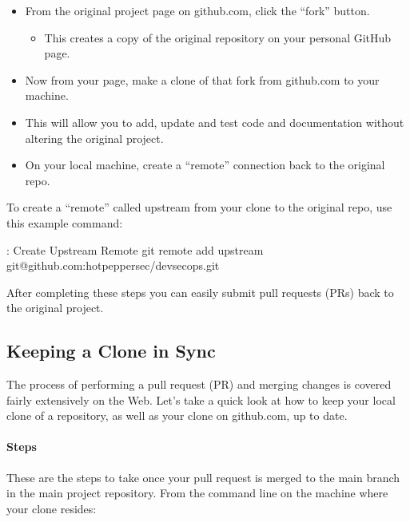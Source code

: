 \begin{itemize}
      \item
            From the original project page on github.com, click the ``fork'' button.
            \begin{itemize}
                  \item
                        This creates a copy of the original repository on your personal
                        GitHub page.
            \end{itemize}
      \item
            Now from your page, make a clone of that fork from github.com to your
            machine.
      \item
            This will allow you to add, update and test code and documentation without altering the original project.
      \item
            On your local machine, create a ``remote'' connection back to the
            original repo.
\end{itemize}

\justify{}
To create a ``remote'' called upstream from your clone to the original
repo, use this example command:

\begin{mybox}{\thetcbcounter: Create Upstream Remote}
git remote add upstream git@github.com:hotpeppersec/devsecops.git
\end{mybox}

\justify{}
After completing these steps you can easily submit pull requests (PRs)
back to the original project.

\hypertarget{keeping-a-clone-in-sync}{%
      \subsection{Keeping a Clone in Sync}\label{keeping-a-clone-in-sync}}

\justify{}
The process of performing a pull request (PR) and merging changes is
covered fairly extensively on the Web. Let's take a quick look at how to
keep your local clone of a repository, as well as your clone on
github.com, up to date.

\hypertarget{steps-1}{%
      \paragraph{Steps}\label{steps-1}}

\justify{}
These are the steps to take once your pull request is merged to the main
branch in the main project repository. From the command line on the
machine where your clone resides:

